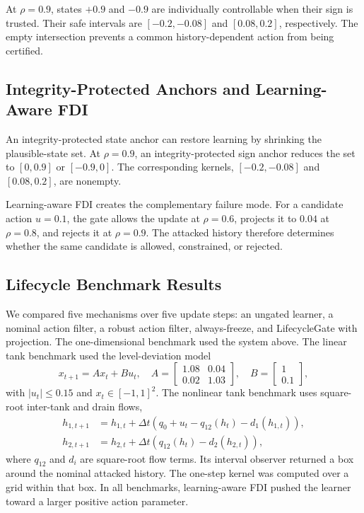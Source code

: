 At $\rho=0.9$, states $+0.9$ and $-0.9$ are individually controllable when
their sign is trusted.  Their safe intervals are $[-0.2,-0.08]$ and
$[0.08,0.2]$, respectively.  The empty intersection prevents a common
history-dependent action from being certified.

\subsection{Integrity-Protected Anchors and Learning-Aware FDI}

An integrity-protected state anchor can restore learning by shrinking the
plausible-state set.  At $\rho=0.9$, an integrity-protected sign anchor reduces the set to $[0,0.9]$ or
$[-0.9,0]$.  The corresponding kernels, $[-0.2,-0.08]$ and $[0.08,0.2]$,
are nonempty.

Learning-aware FDI creates the complementary failure mode.  For a candidate
action $u=0.1$, the gate allows the update at $\rho=0.6$, projects it to
$0.04$ at $\rho=0.8$, and rejects it at $\rho=0.9$.  The attacked history
therefore determines whether the same candidate is allowed, constrained, or
rejected.

\subsection{Lifecycle Benchmark Results}

We compared five mechanisms over five update steps: an ungated learner, a
nominal action filter, a robust action filter, always-freeze, and LifecycleGate
with projection.  The one-dimensional benchmark used the system above.  The
linear tank benchmark used the level-deviation model
\begin{equation}
    x_{t+1}=Ax_t+Bu_t,
    \quad
    A=\begin{bmatrix}1.08&0.04\\0.02&1.03\end{bmatrix},
    \quad
    B=\begin{bmatrix}1\\0.1\end{bmatrix},
\end{equation}
with $|u_t|\le 0.15$ and $x_t\in[-1,1]^2$. The nonlinear tank benchmark uses square-root inter-tank and drain flows,
\begin{equation}
\begin{aligned}
h_{1,t+1} &= h_{1,t}+\Delta t(q_0+u_t-q_{12}(h_t)-d_1(h_{1,t})),\\
h_{2,t+1} &= h_{2,t}+\Delta t(q_{12}(h_t)-d_2(h_{2,t})),
\end{aligned}
\end{equation}
where $q_{12}$ and $d_i$ are square-root flow terms.  Its interval observer
returned a box around the nominal attacked history.  The one-step kernel was
computed over a grid within that box.  In all benchmarks, learning-aware FDI
pushed the learner toward a larger positive action parameter.

